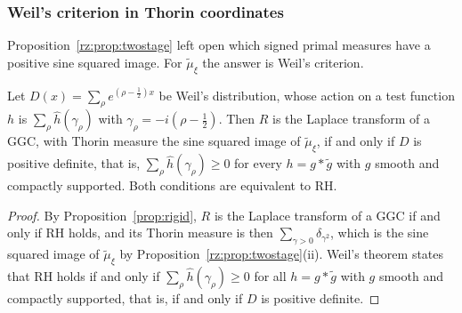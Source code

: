 \subsubsection{Weil's criterion in Thorin coordinates}

Proposition~\ref{rz:prop:twostage} left open which signed primal measures have a positive sine squared image. For $\tilde\mu_\xi$ the answer is Weil's criterion.

\begin{proposition}\label{rz:thm:weil}
Let $D(x)=\sum_\rho e^{(\rho-\frac12)x}$ be Weil's distribution, whose action on a test function $h$ is $\sum_\rho\hat h(\gamma_\rho)$ with $\gamma_\rho=-i(\rho-\frac12)$. Then $R$ is the Laplace transform of a GGC, with Thorin measure the sine squared image of $\tilde\mu_\xi$, if and only if $D$ is positive definite, that is, $\sum_\rho\hat h(\gamma_\rho)\ge0$ for every $h=g*\tilde g$ with $g$ smooth and compactly supported. Both conditions are equivalent to RH.
\end{proposition}

\begin{proof}
By Proposition~\ref{prop:rigid}, $R$ is the Laplace transform of a GGC if and only if RH holds, and its Thorin measure is then $\sum_{\gamma>0}\delta_{\gamma^2}$, which is the sine squared image of $\tilde\mu_\xi$ by Proposition~\ref{rz:prop:twostage}(ii). Weil's theorem \cite{Weil52,Bombieri} states that RH holds if and only if $\sum_\rho\hat h(\gamma_\rho)\ge0$ for all $h=g*\tilde g$ with $g$ smooth and compactly supported, that is, if and only if $D$ is positive definite.
\end{proof}

